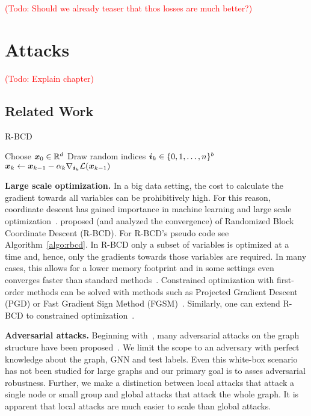 \documentclass[sigconf,authordraft]{acmart}
\newcommand{\todo}[1]{\textcolor{red}{(Todo: #1)}}
\begin{document}
\todo{Should we already teaser that thos losses are much better?}

\section{Attacks}\label{sec:prbcd}

\todo{Explain chapter}

\subsection{Related Work}\label{sec:related} %

\begin{algorithm}[b]
  \small
  \caption{R-BCD~\citep{Nesterov2012}}
  \label{algo:rbcd}
  \begin{algorithmic}[1]
    \STATE Choose \({\bm{x}}_0 \in \mathbb{R}^d\)
    \STATE Draw random indices \({\bm{i}}_k \in \{0, 1, \dots, n\}^b\)
    \STATE \({\bm{x}}_{k} \leftarrow {\bm{x}}_{k-1} - \alpha_{k} \nabla_{{\bm{i}}_{k}} \mathcal{L}({\bm{x}}_{k-1})\)
    \ENDFOR
  \end{algorithmic}
\end{algorithm}

\textbf{Large scale optimization.} In a big data setting, the cost to calculate the gradient towards all variables can be prohibitively high. For this reason, coordinate descent has gained importance in machine learning and large scale optimization~\citep{Wright2015}. \citet{Nesterov2012} proposed (and analyzed the convergence) of Randomized Block Coordinate Descent (R-BCD). For R-BCD's pseudo code see Algorithm~\ref{algo:rbcd}. In R-BCD only a subset of variables is optimized at a time and, hence, only the gradients towards those variables are required. In many cases, this allows for a lower memory footprint and in some settings even converges faster than standard methods~\citep{Nesterov2017}. Constrained optimization with first-order methods can be solved with methods such as Projected Gradient Descent (PGD) or Fast Gradient Sign Method (FGSM)~\cite{Goodfellow2015}. Similarly, one can extend R-BCD to constrained optimization~\citep{Nesterov2012}.

\textbf{Adversarial attacks.} Beginning with~\citep{Dai2018, Zugner2018}, many adversarial attacks on the graph structure have been proposed~\citep{Zugner2019a, Xu2019a, Bojchevski2019, Wu2019, Wang2019, Tang2020}. We limit the scope to an adversary with perfect knowledge about the graph, GNN and test labels. Even this white-box scenario has not been studied for large graphs and our primary goal is to asses adversarial robustness. Further, we make a distinction between local attacks that attack a single node or small group and global attacks that attack the whole graph. It is apparent that local attacks are much easier to scale than global attacks. 
\end{document}
